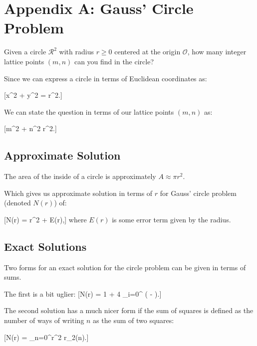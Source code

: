 \section*{Appendix A: Gauss' Circle Problem}

Given a circle $\mathcal{R}^{2}$ with radius $r \geq 0$ centered at the origin $\mathcal{O}$, how many integer lattice points $(m,n)$ can you find in the circle?

Since we can express a circle in terms of Euclidean coordinates as:

[x^{2} + y^{2} = r^{2}.]

We can state the question in terms of our lattice points $(m,n)$ as:

[m^{2} + n^{2} \leq r^{2}.]

\subsection*{Approximate Solution}

The area of the inside of a circle is approximately $A \approx \pi r^{2}$.

Which gives us approximate solution in terms of $r$ for Gauss' circle problem (denoted $N(r)$) of:

[N(r) = \pi r^{2} + E(r),]
where $E(r)$ is some error term given by the radius.


\subsection*{Exact Solutions}

Two forms for an exact solution for the circle problem can be given in terms of sums. 

The first is a bit uglier:
[N(r) = 1 + 4 \sum_{i=0}^{\infty} \left( \rfloor {} \lfloor - \rfloor {} \right).]

The second solution has a much nicer form if the sum of squares is defined as the number of ways of writing $n$ as the sum of two squares:

[N(r) = \sum_{n=0}^{r^{2}} r_{2}(n).]